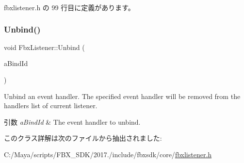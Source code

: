  fbxlistener.\+h の 99 行目に定義があります。

\mbox{\label{class_fbx_listener_a723ba6f82b533e427d72ab39da3f8aeb}} 
\subsubsection{\texorpdfstring{Unbind()}{Unbind()}}
{\footnotesize\ttfamily void Fbx\+Listener\+::\+Unbind (\begin{DoxyParamCaption}\item[{const \hyperlink{class_fbx_event_handler}{Fbx\+Event\+Handler} $\ast$}]{a\+Bind\+Id }\end{DoxyParamCaption})}

Unbind an event handler. The specified event handler will be removed from the handlers list of current listener. 
\begin{DoxyParams}{引数}
{\em a\+Bind\+Id} & The event handler to unbind. \\
\hline
\end{DoxyParams}


このクラス詳解は次のファイルから抽出されました\+:\begin{DoxyCompactItemize}
\item 
C\+:/\+Maya/scripts/\+F\+B\+X\+\_\+\+S\+D\+K/2017./include/fbxsdk/core/\hyperlink{fbxlistener_8h}{fbxlistener.\+h}\end{DoxyCompactItemize}
